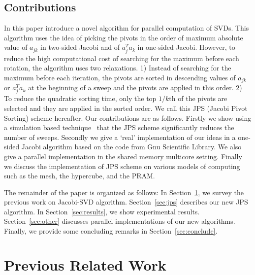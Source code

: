 \documentclass[10pt, conference, compsocconf]{IEEEtran}
\begin{document}
\subsection{Contributions}

In this paper introduce a novel algorithm for parallel computation of SVDs. This algorithm uses the idea of picking the pivots in the order of maximum absolute value of $a_{jk}$ in two-sided Jacobi and of $a_j^T a_k$ in one-sided Jacobi. However, to reduce the high computational cost of searching for the maximum before each rotation, the algorithm uses two relaxations. 1) Instead of searching for the maximum before each iteration, the pivots are sorted in descending values of $a_{jk}$ or $a_j^T a_k$ at the beginning of a sweep and the pivots are applied in this order. 2) To reduce the quadratic sorting time, only the top $1/k$th of the pivots are selected and they are applied in the sorted order. We call this JPS (Jacobi Pivot Sorting) scheme hereafter. Our contributions are as follows. Firstly we show using a simulation based technique~\cite{rajasekaran2008relaxation} that the JPS scheme significantly reduces the number of sweeps. Secondly we give a `real' implementation of our ideas in a one-sided Jacobi algorithm based on the code from Gnu Scientific Library. We also give a parallel implementation in the shared memory multicore setting. Finally we discuss the implementation of JPS scheme on various models of computing such as the mesh, the hypercube, and the PRAM.
 

The remainder of the paper is organized as follows: In Section~\ref{sec:prevwork}, we survey the previous work on Jacobi-SVD algorithm.  Section~\ref{sec:jps} describes our new JPS algorithm. In Section~\ref{sec:results}, we show experimental results. Section~\ref{sec:other} discusses parallel implementations of our new algorithms. Finally, we provide some concluding remarks in Section~\ref{sec:conclude}.

\section{Previous Related Work}
\label{sec:prevwork}
\end{document}
